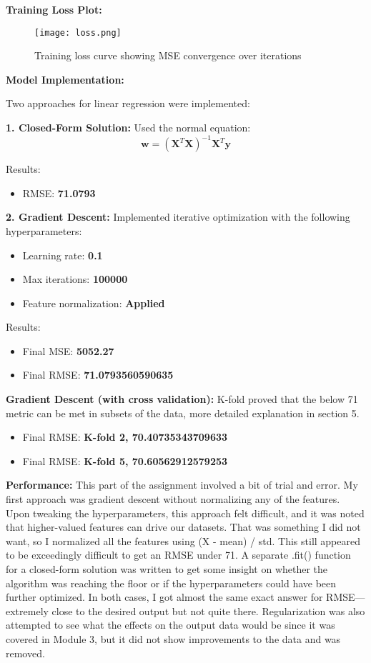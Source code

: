 \documentclass{article}
\begin{document}
\textbf{Training Loss Plot:}
\begin{figure}[h!]
    \centering
    \texttt{[image: loss.png]}
    \caption{Training loss curve showing MSE convergence over iterations}
    \label{fig:loss}
\end{figure}
\vspace{5cm}
\textbf{Model Implementation:}


Two approaches for linear regression were implemented:

\textbf{1. Closed-Form Solution:}  
Used the normal equation:
\[
\mathbf{w} = (\mathbf{X}^T\mathbf{X})^{-1}\mathbf{X}^T\mathbf{y}
\]

Results:
\begin{itemize}
    \item RMSE: \textbf{71.0793}
\end{itemize}


\textbf{2. Gradient Descent:}  
Implemented iterative optimization with the following hyperparameters:
\begin{itemize}
    \item Learning rate: \textbf{0.1}
    \item Max iterations: \textbf{100000}
    \item Feature normalization: \textbf{Applied}
\end{itemize}

Results:
\begin{itemize}
    \item Final MSE: \textbf{ 5052.27}
    \item Final RMSE: \textbf{71.0793560590635}
\end{itemize}

\textbf{Gradient Descent (with cross validation):}
K-fold proved that the below 71 metric can be met in subsets of the data, more detailed explanation in section 5.
\begin{itemize}
    \item Final RMSE: \textbf{K-fold 2, 70.40735343709633}
     \item Final RMSE: \textbf{K-fold 5, 70.60562912579253}
\end{itemize}

\textbf{Performance:}
This part of the assignment involved a bit of trial and error. My first approach was gradient descent without normalizing any of the features. Upon tweaking the hyperparameters, this approach felt difficult, and it was noted that higher-valued features can drive our datasets. That was something I did not want, so I normalized all the features using (X - mean) / std. This still appeared to be exceedingly difficult to get an RMSE under 71. A separate .fit() function for a closed-form solution was written to get some insight on whether the algorithm was reaching the floor or if the hyperparameters could have been further optimized. In both cases, I got almost the same exact answer for RMSE—extremely close to the desired output but not quite there. Regularization was also attempted to see what the effects on the output data would be since it was covered in Module 3, but it did not show improvements to the data and was removed.
\end{document}
